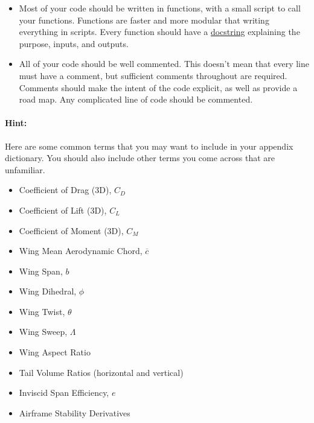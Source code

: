 \documentclass[12pt]{article}
\begin{document}
\begin{enumerate}
	\begin{itemize}
		\item Most of your code should be written in functions, with a small script to call your functions. Functions are faster and more modular that writing everything in scripts.  Every function should have a \href{https://docs.julialang.org/en/v1/manual/documentation/#Writing-Documentation}{docstring} explaining the purpose, inputs, and outputs. 
		\item All of your code should be well commented. This doesn't mean that every line must have a comment, but sufficient comments throughout are required. Comments should make the intent of the code explicit, as well as provide a road map. Any complicated line of code should be commented. 
	\end{itemize}
\end{enumerate}

\bigskip

\paragraph{Hint:} Here are some common terms that you may want to include in your appendix dictionary. You should also include other terms you come across that are unfamiliar.

\begin{multicols}{2}
	\begin{itemize}
		\item Coefficient of Drag (3D), $C_D$
		\item Coefficient of Lift (3D), $C_L$
		\item Coefficient of Moment (3D), $C_M$
		\item Wing Mean Aerodynamic Chord, $\overline{c}$
		\item Wing Span, $b$
		\item Wing Dihedral, $\phi$
		\item Wing Twist, $\theta$
		\item Wing Sweep, $\Lambda$
		\item Wing Aspect Ratio
		\item Tail Volume Ratios (horizontal and vertical)
		\item Inviscid Span Efficiency, $e$
		\item Airframe Stability Derivatives
	\end{itemize}
\end{multicols}
\end{document}
